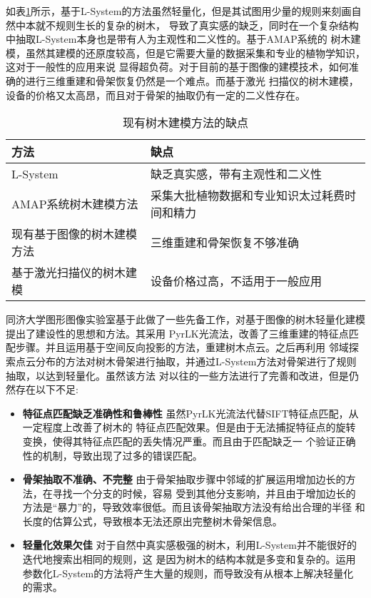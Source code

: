 如表\ref{tab:short}所示，基于L-System的方法虽然轻量化，但是其试图用少量的规则来刻画自然中本就不规则生长的复杂的树木，
导致了真实感的缺乏，同时在一个复杂结构中抽取L-System本身也是带有人为主观性和二义性的。基于AMAP系统的
树木建模，虽然其建模的还原度较高，但是它需要大量的数据采集和专业的植物学知识，这对于一般性的应用来说
显得超负荷。对于目前的基于图像的建模技术，如何准确的进行三维重建和骨架恢复仍然是一个难点。而基于激光
扫描仪的树木建模，设备的价格又太高昂，而且对于骨架的抽取仍有一定的二义性存在。
\begin{table}[H]
	\centering
	\begin{tabular}{|l|l|}
		\hline
		方法 & 缺点\\
		\hline
		L-System & 缺乏真实感，带有主观性和二义性\\
		\hline
		AMAP系统树木建模方法 & 采集大批植物数据和专业知识太过耗费时间和精力\\
		\hline
		现有基于图像的树木建模方法 & 三维重建和骨架恢复不够准确\\
		\hline
		基于激光扫描仪的树木建模 & 设备价格过高，不适用于一般应用\\
		\hline
	\end{tabular}
	\caption{现有树木建模方法的缺点}
	\label{tab:short}
\end{table}

同济大学图形图像实验室基于此做了一些先备工作，对基于图像的树木轻量化建模提出了建设性的思想和方法。其采用
PyrLK光流法，改善了三维重建的特征点匹配步骤。并且运用基于空间反向投影的方法，重建树木点云。之后再利用
邻域探索点云分布的方法对树木骨架进行抽取，并通过L-System方法对骨架进行了规则抽取，以达到轻量化。虽然该方法
对以往的一些方法进行了完善和改进，但是仍然存在以下不足:\\
\begin{itemize}
	\item \textbf{特征点匹配缺乏准确性和鲁棒性} 虽然PyrLK光流法代替SIFT特征点匹配，从一定程度上改善了树木的
		特征点匹配效果。但是由于无法捕捉特征点的旋转变换，使得其特征点匹配的丢失情况严重。而且由于匹配缺乏一
		个验证正确性的机制，导致出现了过多的错误匹配。
	\item \textbf{骨架抽取不准确、不完整} 由于骨架抽取步骤中邻域的扩展运用增加边长的方法，在寻找一个分支的时候，容易
		受到其他分支影响，并且由于增加边长的方法是“暴力”的，导致效率很低。而且该骨架抽取方法没有给出合理的半径
		和长度的估算公式，导致根本无法还原出完整树木骨架信息。
	\item \textbf{轻量化效果欠佳} 对于自然中真实感极强的树木，利用L-System并不能很好的迭代地搜索出相同的规则，这
		是因为树木的结构本就是多变和复杂的。运用参数化L-System的方法将产生大量的规则，而导致没有从根本上解决轻量化
		的需求。
\end{itemize}


